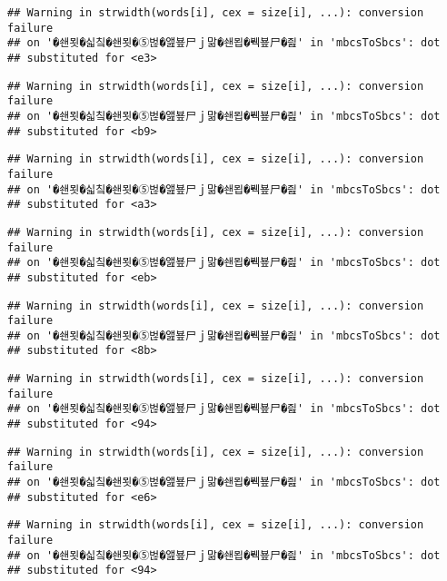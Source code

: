 \documentclass[]{article}
\begin{document}
\begin{verbatim}
## Warning in strwidth(words[i], cex = size[i], ...): conversion failure
## on '�쇈묏�싧칰�쇈묏�⑤벊�앮뵾尸ｊ맒�쇈묍�붹뵾尸�즲' in 'mbcsToSbcs': dot
## substituted for <e3>
\end{verbatim}

\begin{verbatim}
## Warning in strwidth(words[i], cex = size[i], ...): conversion failure
## on '�쇈묏�싧칰�쇈묏�⑤벊�앮뵾尸ｊ맒�쇈묍�붹뵾尸�즲' in 'mbcsToSbcs': dot
## substituted for <b9>
\end{verbatim}

\begin{verbatim}
## Warning in strwidth(words[i], cex = size[i], ...): conversion failure
## on '�쇈묏�싧칰�쇈묏�⑤벊�앮뵾尸ｊ맒�쇈묍�붹뵾尸�즲' in 'mbcsToSbcs': dot
## substituted for <a3>
\end{verbatim}

\begin{verbatim}
## Warning in strwidth(words[i], cex = size[i], ...): conversion failure
## on '�쇈묏�싧칰�쇈묏�⑤벊�앮뵾尸ｊ맒�쇈묍�붹뵾尸�즲' in 'mbcsToSbcs': dot
## substituted for <eb>
\end{verbatim}

\begin{verbatim}
## Warning in strwidth(words[i], cex = size[i], ...): conversion failure
## on '�쇈묏�싧칰�쇈묏�⑤벊�앮뵾尸ｊ맒�쇈묍�붹뵾尸�즲' in 'mbcsToSbcs': dot
## substituted for <8b>
\end{verbatim}

\begin{verbatim}
## Warning in strwidth(words[i], cex = size[i], ...): conversion failure
## on '�쇈묏�싧칰�쇈묏�⑤벊�앮뵾尸ｊ맒�쇈묍�붹뵾尸�즲' in 'mbcsToSbcs': dot
## substituted for <94>
\end{verbatim}

\begin{verbatim}
## Warning in strwidth(words[i], cex = size[i], ...): conversion failure
## on '�쇈묏�싧칰�쇈묏�⑤벊�앮뵾尸ｊ맒�쇈묍�붹뵾尸�즲' in 'mbcsToSbcs': dot
## substituted for <e6>
\end{verbatim}

\begin{verbatim}
## Warning in strwidth(words[i], cex = size[i], ...): conversion failure
## on '�쇈묏�싧칰�쇈묏�⑤벊�앮뵾尸ｊ맒�쇈묍�붹뵾尸�즲' in 'mbcsToSbcs': dot
## substituted for <94>
\end{verbatim}
\end{document}
